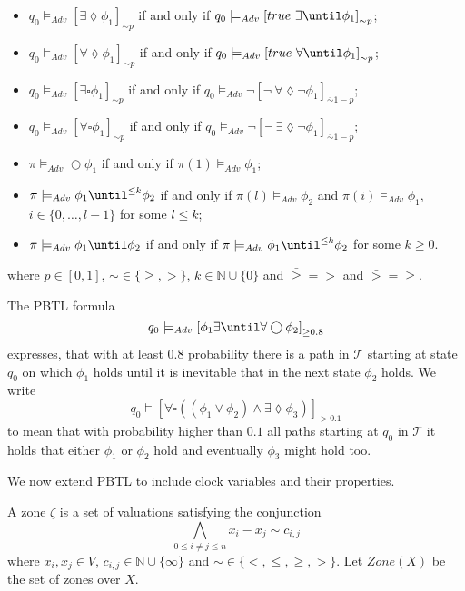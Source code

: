 \begin{defi}
\begin{itemize}
    \item{$q_{0}\models_{Adv}\left[\exists\lozenge\phi_{1}\right]_{\sim p}$ if and only if $q_{0}\models_{Adv} \left[true\ \exists\until \phi_{1}\right]_{\sim p}$;}
    \item{$q_{0}\models_{Adv}\left[\forall\lozenge\phi_{1}\right]_{\sim p}$ if and only if $q_{0}\models_{Adv}\left[true\ \forall\until \phi_{1}\right]_{\sim p}$;}

    \item{$q_{0}\models_{Adv}\left[\exists\square\phi_{1}\right]_{\sim p}$ if and only if $q_{0}\models_{Adv} \lnot \left[\lnot\ \forall\lozenge\lnot \phi_{1}\right]_{\bar{\sim} 1-p}$;}
    \item{$q_{0}\models_{Adv}\left[\forall\square\phi_{1}\right]_{\sim p}$ if and only if $q_{0}\models_{Adv} \lnot \left[\lnot\ \exists\lozenge\lnot \phi_{1}\right]_{\bar{\sim} 1-p}$;}

    \item{$\pi\models_{Adv} \bigcirc\phi_{1}$ if and only if $\pi(1)\models_{Adv}\phi_{1}$;}
    \item{$\pi\models_{Adv} \phi_{1}\until^{\leq k}\phi_{2}$ if and only if $\pi(l)\models_{Adv}\phi_{2}$ and $\pi(i)\models_{Adv}\phi_{1}$, $i\in\{0,\ldots,l-1\}$ for some $l\leq k$;}
    \item{$\pi\models_{Adv}\phi_{1}\until\phi_{2}$ if and only if $\pi\models_{Adv} \phi_{1}\until^{\leq k}\phi_{2}$ for some $k\geq 0$.}
\end{itemize}
where $p\in[0,1]$, $\sim\in\{\geq,>\}$, $k\in\mathbb{N}\cup\{0\}$ and $\bar{\geq}=>$ and $\bar{>}=\geq$.
\end{defi}


\begin{ex}
The PBTL formula
\[
q_{0}\models_{Adv} \left[\phi_{1}\exists\until\forall\bigcirc \phi_{2}\right]_{\geq 0.8}
\]
expresses, that with at least $0.8$ probability there is a path in $\mathcal{T}$ starting at state $q_{0}$ on which $\phi_{1}$ holds until it is inevitable that in the next state $\phi_{2}$ holds.
We write
\[
q_{0}\models\left[\forall\square((\phi_{1}\lor\phi_{2})\land\exists\lozenge\phi_{3})\right]_{>0.1}
\]
to mean that with probability higher than $0.1$ all paths starting at $q_{0}$ in $\mathcal{T}$ it holds that either $\phi_{1}$ or $\phi_{2}$ hold and eventually $\phi_{3}$ might hold too.
\end{ex}
We now extend PBTL to include clock variables and their properties.
\begin{defi}[Zone]
A zone $\zeta$ is a set of valuations satisfying the conjunction
\[
\bigwedge_{0\leq i\neq j\leq n} x_{i}-x_{j}\sim c_{i,j}
\]
where $x_{i},x_{j}\in V$, $c_{i,j}\in\mathbb{N}\cup\{\infty\}$ and $\sim\in\{<,\leq,\geq,>\}$.
Let $Zone(X)$ be the set of zones over $X$.
\end{defi}

